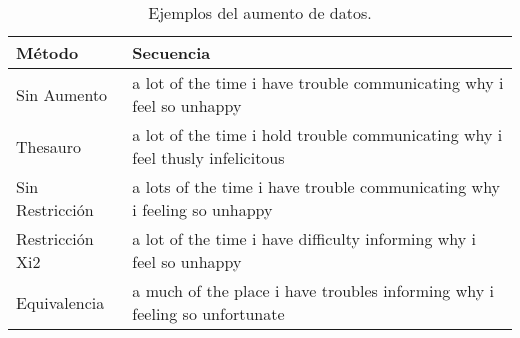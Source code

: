 \begin{table}[hbt!]
\caption{Ejemplos del aumento de datos.} 
\label{table:ejemplos_pos}
\begin{center}

\begin{tabular}{ll}
\hline
\rowcolor[HTML]{EFEFEF} 
\textbf{Método} & \textbf{Secuencia}                                                            \\ \hline
\rowcolor[HTML]{FFFFFF} 
Sin Aumento     & a lot of the time i have trouble communicating why i feel so unhappy          \\ \hline
\rowcolor[HTML]{FFFFFF} 
Thesauro        & a lot of the time i hold trouble communicating why i feel thusly infelicitous \\ \hline
\rowcolor[HTML]{FFFFFF} 
Sin Restricción & a lots of the time i have trouble communicating why i feeling so unhappy      \\ \hline
\rowcolor[HTML]{FFFFFF} 
Restricción Xi2 & a lot of the time i have difficulty informing why i feel so unhappy           \\ \hline
\rowcolor[HTML]{FFFFFF} 
Equivalencia    & a much of the place i have troubles informing why i feeling so unfortunate    \\ \hline
\end{tabular}
\end{center}
\end{table}